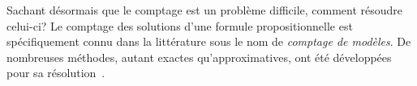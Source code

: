 Sachant désormais que le comptage est un problème difficile, comment résoudre celui-ci? Le comptage des solutions d'une formule propositionnelle est spécifiquement connu dans la littérature sous le nom de \textit{comptage de modèles}. De nombreuses méthodes, autant exactes qu'approximatives, ont été développées pour sa résolution~\cite{biereHandbookSatisfiabilityVolume2009}. 

